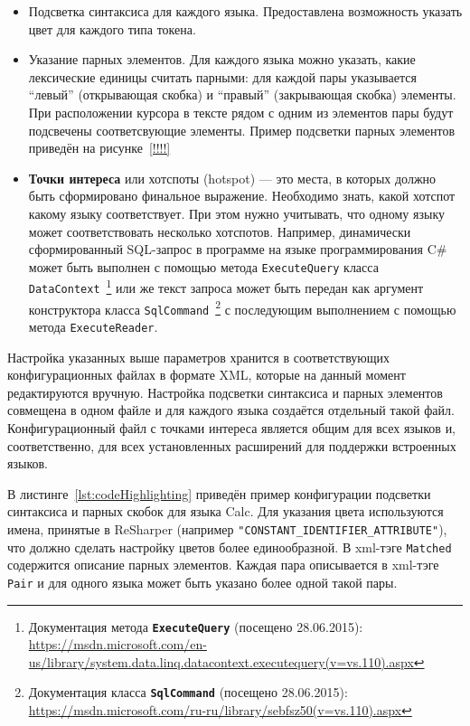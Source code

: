 \begin{itemize}
    \item Подсветка синтаксиса для каждого языка. Предоставлена возможность указать цвет для каждого типа токена.
    \item Указание парных элементов. Для каждого языка можно указать, какие лексические единицы считать парными: для каждой пары указывается ``левый'' (открывающая скобка) и ``правый'' (закрывающая скобка) элементы. При расположении курсора в тексте рядом с одним из элементов пары будут подсвечены соответсвующие элементы. Пример подсветки парных элементов приведён на рисунке~\ref{!!!!}
    \item \textbf{Точки интереса} или хотспоты (hotspot) --- это места, в которых должно быть сформировано финальное выражение. Необходимо знать, какой хотспот какому языку соответствует. При этом нужно учитывать, что одному языку может соответствовать несколько хотспотов. Например, динамически сформированный SQL-запрос в программе на языке программирования C\# может быть выполнен с помощью метода \verb|ExecuteQuery| класса \verb|DataContext|~\footnote{Документация метода \textbf{\texttt{ExecuteQuery}} (посещено 28.06.2015): \url{https://msdn.microsoft.com/en-us/library/system.data.linq.datacontext.executequery(v=vs.110).aspx}} или же текст запроса может быть передан как аргумент конструктора класса \verb|SqlCommand|~\footnote{Документация класса \textbf{\texttt{SqlCommand}} (посещено 28.06.2015): \url{https://msdn.microsoft.com/ru-ru/library/sebfsz50(v=vs.110).aspx}} с последующим выполнением с помощью метода \verb|ExecuteReader|.

\end{itemize}

Настройка указанных выше параметров хранится в соответствующих конфигурационных файлах в формате XML, которые на данный момент редактируются вручную. Настройка подсветки синтаксиса и парных элементов совмещена в одном файле и для каждого языка создаётся отдельный такой файл. Конфигурационный файл с точками интереса является общим для всех языков и, соответственно, для всех установленных расширений для поддержки встроенных языков.

В листинге~\ref{lst:codeHighlighting} приведён пример конфигурации подсветки синтаксиса и парных скобок для языка Calc. Для указания цвета используются имена, принятые в ReSharper (например \verb|"CONSTANT_IDENTIFIER_ATTRIBUTE"|), что должно сделать настройку цветов более единообразной. В xml-тэге \verb|Matched| содержится описание парных элементов. Каждая пара описывается в xml-тэге \verb|Pair| и для одного языка может быть указано более одной такой пары.

